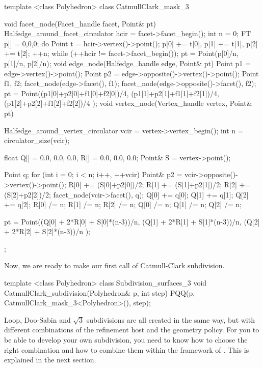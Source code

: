 \begin{ccExampleCode}
template <class Polyhedron>
class CatmullClark_mask_3 {
  void facet_node(Facet_handle facet, Point& pt) {
    Halfedge_around_facet_circulator hcir = facet->facet_begin();
    int n = 0;
    FT p[] = {0,0,0};
    do {
      Point t = hcir->vertex()->point();
      p[0] += t[0], p[1] += t[1], p[2] += t[2]; 
      ++n;
    } while (++hcir != facet->facet_begin());
    pt = Point(p[0]/n, p[1]/n, p[2]/n);
  }
  void edge_node(Halfedge_handle edge, Point& pt) {
    Point p1 = edge->vertex()->point();
    Point p2 = edge->opposite()->vertex()->point();
    Point f1, f2;
    facet_node(edge->facet(), f1);
    facet_node(edge->opposite()->facet(), f2);
    pt = Point((p1[0]+p2[0]+f1[0]+f2[0])/4,
               (p1[1]+p2[1]+f1[1]+f2[1])/4,
               (p1[2]+p2[2]+f1[2]+f2[2])/4 );
  }
  void vertex_node(Vertex_handle vertex, Point& pt) {
    Halfedge_around_vertex_circulator vcir = vertex->vertex_begin();
    int n = circulator_size(vcir);    

    float Q[] = {0.0, 0.0, 0.0}, R[] = {0.0, 0.0, 0.0};
    Point& S = vertex->point();
    
    Point q;
    for (int i = 0; i < n; i++, ++vcir) {
      Point& p2 = vcir->opposite()->vertex()->point();
      R[0] += (S[0]+p2[0])/2;
      R[1] += (S[1]+p2[1])/2;
      R[2] += (S[2]+p2[2])/2;
      facet_node(vcir->facet(), q);
      Q[0] += q[0];      
      Q[1] += q[1];      
      Q[2] += q[2];
    }
    R[0] /= n;    R[1] /= n;    R[2] /= n;
    Q[0] /= n;    Q[1] /= n;    Q[2] /= n;
      
    pt = Point((Q[0] + 2*R[0] + S[0]*(n-3))/n,
               (Q[1] + 2*R[1] + S[1]*(n-3))/n,
               (Q[2] + 2*R[2] + S[2]*(n-3))/n );
  }
};
\end{ccExampleCode}

Now, we are ready to make our first call of Catmull-Clark 
subdivision.

\begin{ccExampleCode}
template <class Polyhedron>
class Subdivision_surfaces_3 {
  void CatmullClark_subdivision(Polyhedron& p, int step) {
    PQQ(p, CatmullClark_mask_3<Polyhedron>(), step);
  }
}
\end{ccExampleCode}

Loop, Doo-Sabin and $\sqrt{3}$ subdivisions are all created in the
same way, but with different combinations of the 
refinement host and the geometry policy. For you to be able to 
develop your own subdivision, you need to know how to choose the 
right combination and how to combine them within the framework
of . This is explained in the next section.

